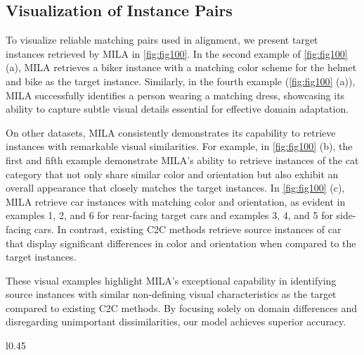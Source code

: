 \documentclass{bmvc2k}
\newcommand{\xmark}{\ding{55}}
\begin{document}
\subsection{Visualization of Instance Pairs}\label{sec:qualitative}
To visualize reliable matching pairs used in alignment, we present target instances retrieved by MILA in \cref{fig:fig100}.
In the second example of \cref{fig:fig100} (a), MILA retrieves a biker instance with a matching color scheme for the helmet and bike as the target instance. Similarly, in the fourth example (\cref{fig:fig100} (a)), MILA successfully identifies a person wearing a matching dress, showcasing its ability to capture subtle visual details essential for effective domain adaptation. 

On other datasets, MILA consistently demonstrates its capability to retrieve instances with remarkable visual similarities. For example, in \cref{fig:fig100} (b), the first and fifth example demonstrate MILA's ability to retrieve instances of the cat category that not only share similar color and orientation but also exhibit an overall appearance that closely matches the target instances.
In \cref{fig:fig100} (c), MILA retrieve car instances with matching color and orientation, as evident in examples 1, 2, and 6 for rear-facing target cars and examples 3, 4, and 5 for side-facing cars. In contrast, existing C2C methods retrieve source instances of car that display significant differences in color and orientation when compared to the target instances.


These visual examples highlight MILA's exceptional capability in identifying source instances with similar non-defining visual characteristics as the target compared to existing C2C methods. By focusing solely on domain differences and disregarding unimportant dissimilarities, our model achieves superior accuracy.
















\begin{wraptable}{l}{0.45\textwidth}
\footnotesize
\centering
\addtolength{\tabcolsep}{-4.0pt}
 \scalebox{0.9}{
\begin{tabular*}{0.45 \textwidth}{@{\extracolsep{\fill}\quad}l|ccccc}
\toprule
mAP &  &  &  &  &  \\
\midrule
 & \checkmark & \checkmark & \checkmark & \checkmark & \xmark \\
 &\xmark & \xmark & \xmark & \xmark & \checkmark  \\
 &\checkmark & \xmark & \checkmark & \checkmark & \xmark \\
 & \checkmark & \checkmark & \xmark & \checkmark & \xmark   \\
 &\checkmark & \checkmark & \checkmark & \xmark & \checkmark   \\


\bottomrule
\end{tabular*}
}
 \caption{Ablation study of different components. } \label{tab:tableab_}
\end{wraptable}
\end{document}
